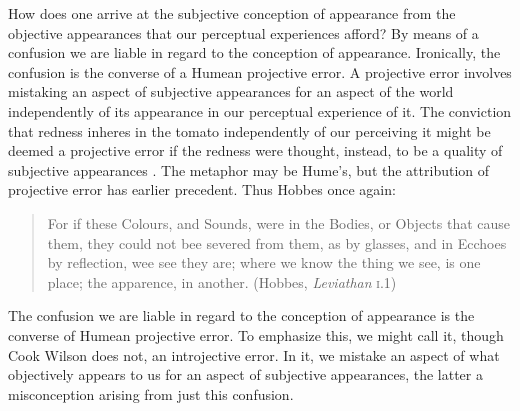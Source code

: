 \documentclass[12pt]{article}
\begin{document}
How does one arrive at the subjective conception of appearance from the objective appearances that our perceptual experiences afford? By means of a confusion we are liable in regard to the conception of appearance. Ironically, the confusion is the converse of a Humean projective error. A projective error involves mistaking an aspect of subjective appearances for an aspect of the world independently of its appearance in our perceptual experience of it. The conviction that redness inheres in the tomato independently of our perceiving it might be deemed a projective error if the redness were thought, instead, to be a quality of subjective appearances \citep[for a contemporary version of this view see][]{Boghossian-Velleman:1989af,Boghossian-Velleman:1991as}. The metaphor may be Hume's, but the attribution of projective error has earlier precedent. Thus Hobbes once again:
\begin{quote}
    For if these Colours, and Sounds, were in the Bodies, or Objects that cause them, they could not bee severed from them, as by glasses, and in Ecchoes by reflection, wee see they are; where we know the thing we see, is one place; the apparence, in another. (Hobbes, \emph{Leviathan} \textsc{i}.1)
\end{quote}
The confusion we are liable in regard to the conception of appearance is the converse of Humean projective error. To emphasize this, we might call it, though Cook Wilson does not, an introjective error. In it, we mistake an aspect of what objectively appears to us for an aspect of subjective appearances, the latter a misconception arising from just this confusion.
\end{document}
